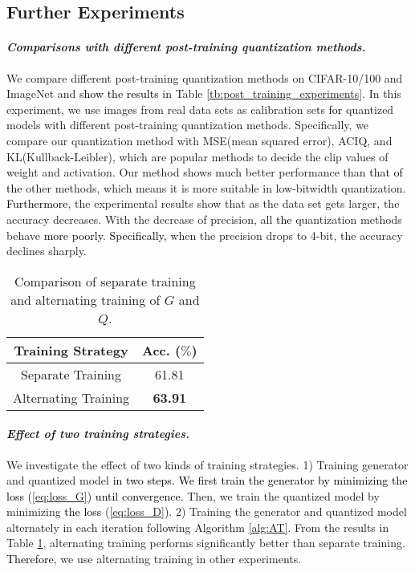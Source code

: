 \documentclass[runningheads]{llncs}
\def\jing{\textcolor{black}}
\def\new{\textcolor{black}}
\begin{document}
\subsection{Further Experiments}
\paragraph{\emph{\textbf{Comparisons with different post-training quantization methods.}}}
We compare different post-training quantization methods \cite{sung2015resiliency,banner2018aciq,chen2015mxnet} on CIFAR-10/100 and ImageNet and \jing{show the results} in Table \ref{tb:post_training_experiments}. In this experiment, we use images from real data sets as calibration sets \new{for} quantized models with different post-training quantization methods. 
Specifically, we compare our quantization method with MSE(mean squared error), ACIQ, and KL(Kullback-Leibler), which are popular methods to decide the clip values of weight and activation. 
Our method shows much better performance than \new{that of the} other methods, which means it is more suitable in low-bitwidth quantization. 
\new{Furthermore}, the experimental results show that as the data set gets larger, the accuracy decreases. 
With the decrease of precision, all \new{the} quantization methods behave \new{more poorly}. \new{Specifically,} when the precision drops to 4-bit, the accuracy declines sharply.




\begin{table}[t]
\tabcolsep=15pt
\begin{center}
\caption{Comparison of separate training and alternating training of $G$ and $Q$.}
\label{tb:alternately_training}
\begin{tabular}{cc}
\hline
Training Strategy & Acc. ($\%$) \\ \hline
Separate Training & 61.81 \\
Alternating Training        & \textbf{63.91}             \\
\hline
\end{tabular}
\end{center}
\end{table}

\paragraph{\emph{\textbf{Effect of two training strategies.}}}
We investigate the effect of two kinds of training strategies.
1) Training generator and quantized model \jing{in two steps. We first train the generator by minimizing \new{the loss} (\ref{eq:loss_G}) until convergence}. Then, we train the quantized model by minimizing \new{the loss} (\ref{eq:loss_D}).
2) Training the generator and quantized model alternately in each iteration following Algorithm \ref{alg:AT}.
From the results in Table \ref{tb:alternately_training}, alternating training performs significantly better than separate training.
\new{Therefore,} we use alternating training in other experiments.
\end{document}
